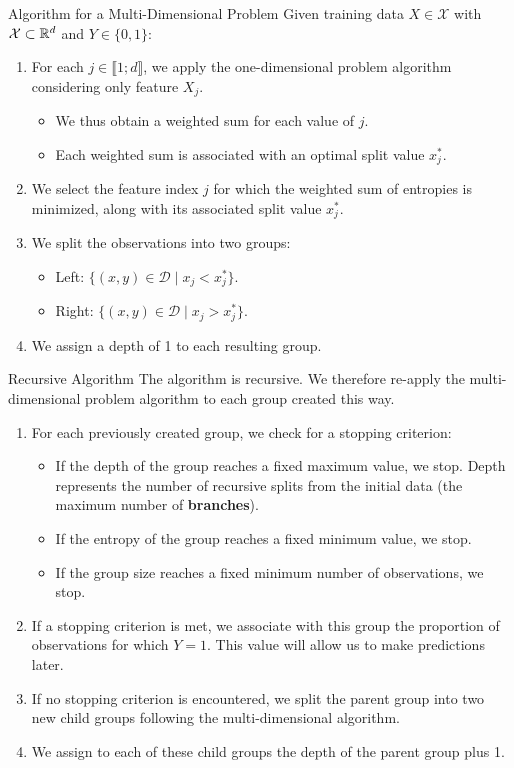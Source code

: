 \begin{frame}{Algorithm for a Multi-Dimensional Problem}
	Given training data $X \in \mathcal{X}$ with $\mathcal{X} \subset \mathbb{R}^d$ and $Y \in\{0, 1\}$:
	\begin{enumerate}
		\item For each $j \in \llbracket 1; d \rrbracket$, we apply the one-dimensional problem algorithm considering only feature $X_j$.
		\begin{itemize}
			\item We thus obtain a weighted sum for each value of $j$.
			\item Each weighted sum is associated with an optimal split value $x_j^*$.
		\end{itemize}
		\pause
		\item We select the feature index $j$ for which the weighted sum of entropies is minimized, along with its associated split value $x_j^*$.
		\pause
		\item We split the observations into two groups:
		\begin{itemize}
			\item Left: $\{(x, y) \in \mathcal{D} \mid x_j < x_j^*\}$.
			\item Right: $\{(x, y) \in \mathcal{D} \mid x_j > x_j^*\}$.
		\end{itemize}
		\pause
		\item We assign a depth of 1 to each resulting group.
	\end{enumerate}
\end{frame}

\begin{frame}{Recursive Algorithm}
	The algorithm is recursive. We therefore re-apply the multi-dimensional problem algorithm to each group created this way.
	\begin{enumerate}
		\item For each previously created group, we check for a stopping criterion:
		\begin{itemize}
			\item If the depth of the group reaches a fixed maximum value, we stop. Depth represents the number of recursive splits from the initial data (the maximum number of \textbf{branches}).
			\item If the entropy of the group reaches a fixed minimum value, we stop.
			\item If the group size reaches a fixed minimum number of observations, we stop.
		\end{itemize}
		\item If a stopping criterion is met, we associate with this group the proportion of observations for which $Y = 1$. This value will allow us to make predictions later.
		\item If no stopping criterion is encountered, we split the parent group into two new child groups following the multi-dimensional algorithm.
		\item We assign to each of these child groups the depth of the parent group plus 1.
	\end{enumerate}
\end{frame}

